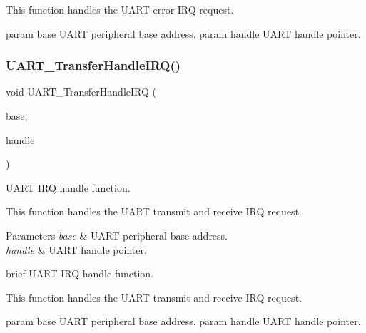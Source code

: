 This function handles the U\+A\+RT error I\+RQ request.

param base U\+A\+RT peripheral base address. param handle U\+A\+RT handle pointer. \mbox{\label{group__uart__driver_gadb0c4f1e5b59db3aa2261df4f5ddb48d}} 
\subsubsection{\texorpdfstring{UART\_TransferHandleIRQ()}{UART\_TransferHandleIRQ()}}
{\footnotesize\ttfamily void U\+A\+R\+T\+\_\+\+Transfer\+Handle\+I\+RQ (\begin{DoxyParamCaption}\item[{\mbox{\hyperlink{struct_u_a_r_t___type}{U\+A\+R\+T\+\_\+\+Type}} $\ast$}]{base,  }\item[{\mbox{\hyperlink{struct__uart__handle}{uart\+\_\+handle\+\_\+t}} $\ast$}]{handle }\end{DoxyParamCaption})}



U\+A\+RT I\+RQ handle function. 

This function handles the U\+A\+RT transmit and receive I\+RQ request.


\begin{DoxyParams}{Parameters}
{\em base} & U\+A\+RT peripheral base address. \\
\hline
{\em handle} & U\+A\+RT handle pointer.\\
\hline
\end{DoxyParams}
brief U\+A\+RT I\+RQ handle function.

This function handles the U\+A\+RT transmit and receive I\+RQ request.

param base U\+A\+RT peripheral base address. param handle U\+A\+RT handle pointer. \mbox{\label{group__uart__driver_gaf804acde5d73ce0a5bf54b06195e1218}} 
